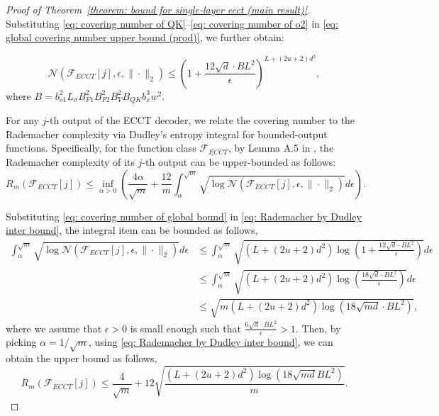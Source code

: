 \documentclass[lettersize,onecolumn]{IEEEtran}
\begin{document}
\begin{proof}[Proof of Theorem~\ref{theorem: bound for single-layer ecct (main result)}]
Substituting \eqref{eq: covering number of QK}--\eqref{eq: covering number of o2} in \eqref{eq: global covering number upper bound (prod)}, we further obtain:

\begin{equation}
    \mathcal{N}(\mathcal{F}_{ECCT}[j],\epsilon,\|\cdot\|_{2}) \leq \left(1+\frac{12 \sqrt{d} \cdot B L^{2}}{\epsilon}\right)^{L+(2 u+2) d^{2}},
    \label{eq: covering number of global bound}
\end{equation}
where $B=b_{o1}^{2} L_{\sigma} B_{F1}^{2} B_{F2}^{2} B_{V}^{2} B_{QK} b_{x}^{3}w^{2}$.

For any $j$-th output of the ECCT decoder, we relate the covering number to the Rademacher complexity via Dudley’s entropy integral \cite{dudley1967sizesofcompactsubsetsofhilbertspace} for bounded-output functions. Specifically, for the function class $\mathcal{F}_{ECCT}$, by Lemma A.5 in \cite{bartlett2017spectrallynormalizedmarginbounds}, the Rademacher complexity of its $j$-th output can be upper-bounded as follows:
\begin{equation}
    R_{m}(\mathcal{F}_{ECCT}[j]) \leq \inf_{\alpha>0}\left(\frac{4 \alpha}{\sqrt{m}}+\frac{12}{m} \int_{\alpha}^{\sqrt{m}} \sqrt{\log \mathcal{N}\left(\mathcal{F}_{ECCT}[j], \epsilon,\|\cdot \|_{2} \right)}d \epsilon\right).
    \label{eq: Rademacher by Dudley inter bound}
\end{equation}

Substituting \eqref{eq: covering number of global bound} in \eqref{eq: Rademacher by Dudley inter bound}, the integral item can be bounded as follows,
\begin{equation}\begin{aligned}
    \int_{\alpha}^{\sqrt{m}} \sqrt{\log \mathcal{N}\left(\mathcal{F}_{ECCT}[j], \epsilon,\|\cdot \|_{2} \right)}d \epsilon &\leq \int_{\alpha}^{\sqrt{m}} \sqrt{(L+(2u+2)d^{2})\log\left(1+\frac{12 \sqrt{d} \cdot B L^{2}}{\epsilon}\right)}d \epsilon \\
    &\leq \int_{\alpha}^{\sqrt{m}} \sqrt{\left(L+(2u+2)d^{2}\right)\log\left(\frac{18 \sqrt{d} \cdot B L^{2}}{\epsilon}\right)}d \epsilon \\
    &\leq \sqrt{m(L+(2u+2)d^{2})\log\left(18 \sqrt{md} \cdot B L^{2}\right)},
    \label{eq: Dudley inter uppper bound}
\end{aligned}\end{equation}
where we assume that $\epsilon>0$ is small enough such that $\frac{6\sqrt{d} \cdot B L^{2}}{\epsilon}>1$. Then, by picking $\alpha=1/\sqrt{m}$, using \eqref{eq: Rademacher by Dudley inter bound}, we can obtain the upper bound as follows,
\begin{equation}
    R_{m}(\mathcal{F}_{ECCT}[j]) \leq \frac{4}{\sqrt{m}}+12 \sqrt{\frac{(L+(2 u+2) d^{2}) \log (18 \sqrt{m d}B L^{2})}{m}}.
    \label{eq: Rademacher bound for ECCT j}
\end{equation}


\end{proof}
\end{document}
